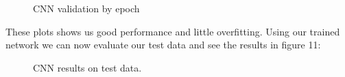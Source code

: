 \documentclass[11pt]{article}
\begin{document}
\begin{singlespace}
\pagebreak

\begin{figure}[h]
    \centering
    
    \caption{CNN validation by epoch}
\end{figure} 

These plots shows us good performance and little overfitting. Using our trained network we can now evaluate our test data and see the results in figure 11: 

\begin{figure}[h]
    \centering
    
    \caption{CNN results on test data.}
\end{figure}


\end{singlespace}
\end{document}
